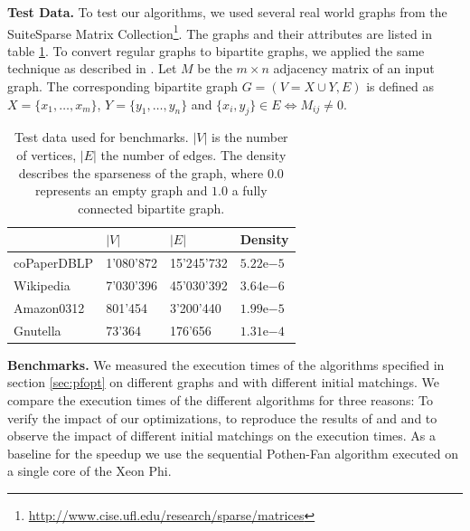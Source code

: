 \documentclass[letterpaper]{article}
\newcommand{\mypar}[1]{{\bf #1.}}
\begin{document}

\mypar{Test Data}
To test our algorithms, we used several real world graphs from the SuiteSparse Matrix Collection\footnote{\url{http://www.cise.ufl.edu/research/sparse/matrices}}.
The graphs and their attributes are listed in table \ref{table:testdata}. 
To convert regular graphs to bipartite graphs, we applied the same technique as described in \cite{Azad:2015}. 
Let $M$ be the $m \times n$ adjacency matrix of an input graph. 
The corresponding bipartite graph $G = (V = X \cup Y, E)$ is defined as $X = \{x_1, \dots, x_m\}$, $Y = \{y_1, \dots, y_n\}$ and $\{x_i, y_j\} \in E \iff M_{ij} \neq 0$.\\


\begin{table}
\centering
\begin{tabular}{ |l|l|l|l| }
\hline
 & $\lvert V \rvert$ & $\lvert E \rvert$ & Density \\ \hline
coPaperDBLP & 1'080'872 & 15'245'732 & $5.22\mathrm{e}{-5}$ \\ \hline
Wikipedia & 7'030'396 & 45'030'392 & $3.64\mathrm{e}{-6}$ \\ \hline
Amazon0312 & 801'454 & 3'200'440 & $1.99\mathrm{e}{-5}$ \\ \hline
Gnutella & 73'364 & 176'656 & $1.31\mathrm{e}{-4}$ \\ \hline
\end{tabular}
\caption{Test data used for benchmarks. $\lvert V \rvert$ is the number of vertices, $\lvert E \rvert$ the number of edges. The density describes the sparseness of the graph, where $0.0$ represents an empty graph and $1.0$ a fully connected bipartite graph.}
\label{table:testdata}
\end{table}

\mypar{Benchmarks}
We measured the execution times of the algorithms specified in section \ref{sec:pfopt} on different graphs and with different initial matchings. We compare the execution times of the different algorithms for three reasons: To verify the impact of our optimizations, to reproduce the results of \cite{Azad:2012} and \cite{Azad:2015} and to observe the impact of different initial matchings on the execution times. As a baseline for the speedup we use the sequential Pothen-Fan algorithm executed on a single core of the Xeon Phi.\\
\end{document}
